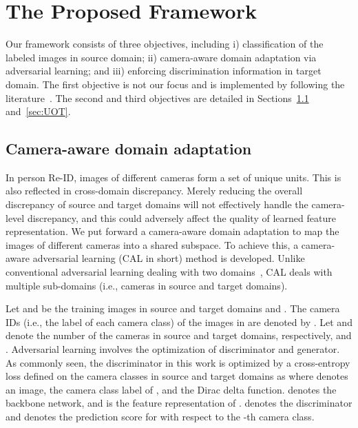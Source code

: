 \documentclass[10pt,twocolumn,letterpaper]{article}
\begin{document}
\section{The Proposed Framework}
 
Our framework consists of three objectives, including i) classification of the labeled images in source domain; ii) camera-aware domain adaptation via adversarial learning; and iii) enforcing discrimination information in target domain. The first objective is not our focus and is implemented by following the literature~\cite{DBLP:conf/cvpr/TzengHSD17,DBLP:conf/icml/LongC0J15}. The second and third objectives are detailed in Sections~\ref{sec:CAL} and~\ref{sec:UOT}. 







\subsection{Camera-aware domain adaptation}\label{sec:CAL}
 
In person Re-ID, images of different cameras form a set of unique units. This is also reflected in cross-domain discrepancy. 
Merely reducing the overall discrepancy of source and target domains will not effectively handle the camera-level discrepancy, and this could adversely affect the quality of learned feature representation. We put forward a camera-aware domain adaptation to map the images of different cameras into a shared subspace. To achieve this, a camera-aware adversarial learning (CAL in short) method is developed. Unlike conventional adversarial learning dealing with two domains~\cite{DBLP:conf/icml/GaninL15}, CAL deals with multiple sub-domains (i.e., cameras in source and target domains). 
 
Let  and  be the training images in source and target domains and . The camera IDs (i.e., the label of each camera class) of the images in  are denoted by . Let  and  denote the number of the cameras in source and target domains, respectively, and . Adversarial learning involves the optimization of discriminator and generator. As commonly seen, the discriminator in this work is optimized by a cross-entropy loss defined on the  camera classes in source and target domains as
 where  denotes an image,  the camera class label of , and  the Dirac delta function.  denotes the backbone network, and  is the feature representation of .  denotes the discriminator and  denotes the prediction score for  with respect to the -th camera class.
 
\end{document}
